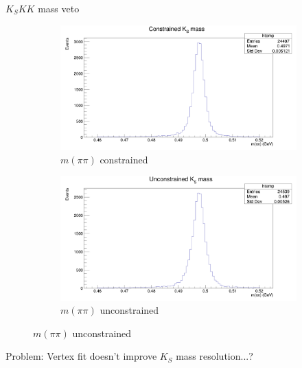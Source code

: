 \documentclass{beamer}
\begin{document}
\begin{frame}{$K_SKK$ mass veto}
  \begin{figure}
    \centering
    \begin{subfigure}{0.5\textwidth}
      \centering
      \includegraphics[width=\textwidth]{ConstrainedKSMass.png}
      \caption{$m(\pi\pi)$ constrained}
    \end{subfigure}%
    \begin{subfigure}{0.5\textwidth}
      \centering
      \includegraphics[width=\textwidth]{UnconstrainedKSMass.png}
      \caption{$m(\pi\pi)$ unconstrained}
    \end{subfigure}
  \end{figure}
  Problem: Vertex fit doesn't improve $K_S$ mass resolution...?
\end{frame}
\end{document}

